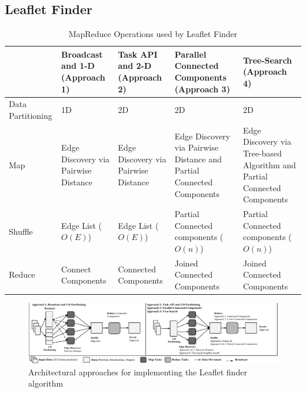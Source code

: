 \subsection{Leaflet Finder}
\label{sec:leaflet}
\begin{table}[t]
    \scriptsize
    \centering
    \begin{tabular}{@{}p{2cm}|p{2.8cm}p{2.8cm}p{2.8cm}p{2.8cm}@{}}
        \toprule
        &
        \textbf{Broadcast and 1-D} (Approach 1) &
        \textbf{Task API and 2-D} (Approach 2) &
        \textbf{Parallel Connected Components} (Approach 3) &
        \textbf{Tree-Search} (Approach 4)\\
        \midrule
        Data Partitioning  & 
        1D  & 
        2D & 
        2D & 
        2D\\
        Map & 
        Edge Discovery via Pairwise Distance &
        Edge Discovery via Pairwise Distance &
        Edge Discovery via Pairwise Distance and Partial Connected Components & 
        Edge Discovery via Tree-based Algorithm and Partial Connected Components\\
        Shuffle &
        Edge List ($O(E)$) &
        Edge List ($O(E)$) &
        Partial Connected components ($O(n)$) &
        Partial Connected components ($O(n)$)\\
        Reduce   &
        Connect Components  &
        Connected Components &
        Joined Connected Components &
        Joined Connected Components\\
        \bottomrule
    \end{tabular}
    \caption{MapReduce Operations used by Leaflet Finder\label{tab:app_operators}}
\end{table}

\begin{figure}[t]
    \centering
    \includegraphics[width=.95\textwidth]{figures/data_analytics_hpc/task_par/lf_approaches.pdf}
    \caption{Architectural approaches for implementing the Leaflet finder algorithm\label{fig:lf_approaches}} 
\end{figure}

